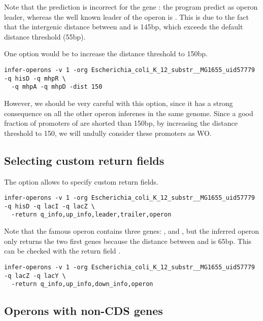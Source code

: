 Note that the prediction is incorrect for the gene : the
program predict  as operon leader, whereas the well known
leader of the  operon is . This is due to the
fact that the intergenic distance between  and 
is 145bp, which exceeds the default distance threshold (55bp). 

One option would be to increase the distance threshold to 150bp. 


\begin{lstlisting}
infer-operons -v 1 -org Escherichia_coli_K_12_substr__MG1655_uid57779 -q hisD -q mhpR \
  -q mhpA -q mhpD -dist 150
\end{lstlisting}

However, we should be very careful with this option, since it has a
strong consequence on all the other operon inferenes in the same
genome. Since a good fraction of promoters of 
are shorted than 150bp, by increasing the distance threshold to 150,
we will undully consider these promoters as WO.

\subsection{Selecting custom return fields}

The option  allows to specify custom return fields.

\begin{lstlisting}
infer-operons -v 1 -org Escherichia_coli_K_12_substr__MG1655_uid57779 -q hisD -q lacI -q lacZ \
  -return q_info,up_info,leader,trailer,operon
\end{lstlisting}

Note that the famous  operon contains three genes:
,  and , but the inferred operon only
returns the two first genes because the distance between 
and \gene{lacA} is 65bp. This can be checked with the return field
\option{down\_info}.

\begin{lstlisting}
infer-operons -v 1 -org Escherichia_coli_K_12_substr__MG1655_uid57779 -q lacZ -q lacY \
  -return q_info,up_info,down_info,operon
\end{lstlisting}

\subsection{Operons with non-CDS genes}


